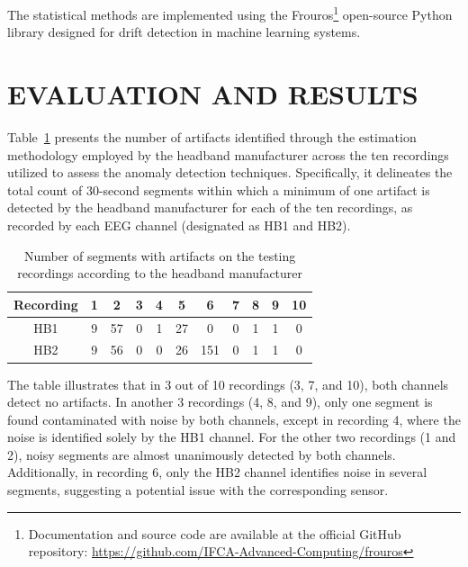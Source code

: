 \documentclass[conference]{IEEEtran}
\begin{document}
The statistical methods are implemented using the Frouros\footnote{Documentation and source code are available at the official GitHub repository: \url{https://github.com/IFCA-Advanced-Computing/frouros}} open-source Python library designed for drift detection in machine learning systems.




\section{EVALUATION AND RESULTS}
\label{sec:results}

Table~\ref{tab2} presents the number of artifacts identified through
the estimation methodology employed by the headband manufacturer
across the ten recordings utilized to assess the anomaly detection
techniques. Specifically, it delineates the total count of 30-second
segments within which a minimum of one artifact is detected by the
headband manufacturer for each of the ten recordings, as recorded by
each EEG channel (designated as HB1 and HB2).

\begin{table}[bt]
\caption{Number of segments with artifacts on the testing recordings according to the headband manufacturer}
    \centering
    \renewcommand{\arraystretch}{1.3} %
    \begin{tabular}{|c|c|c|c|c|c|c|c|c|c|c|}
        \hline
        \textbf{Recording} & \textbf{1} & \textbf{2} & \textbf{3} & \textbf{4} & \textbf{5} & \textbf{6} & \textbf{7} & \textbf{8} & \textbf{9} & \textbf{10} \\
        \hline
        HB1 & 9 & 57 & 0 & 1 & 27 & 0 & 0 & 1 & 1 & 0 \\
        \hline
        HB2 & 9 & 56 & 0 & 0 & 26 & 151 & 0 & 1 & 1 & 0 \\
        \hline
    \end{tabular}
    \label{tab2}
\end{table}

The table illustrates that in 3 out of 10 recordings (3, 7, and 10), both channels detect no artifacts. In another 3 recordings (4, 8, and 9), only one segment is found contaminated with noise by both channels, except in recording 4, where the noise is identified solely by the HB1 channel. For the other two recordings (1 and 2), noisy segments are almost unanimously detected by both channels. Additionally, in recording 6, only the HB2 channel identifies noise in several segments, suggesting a potential issue with the corresponding sensor.
\end{document}

